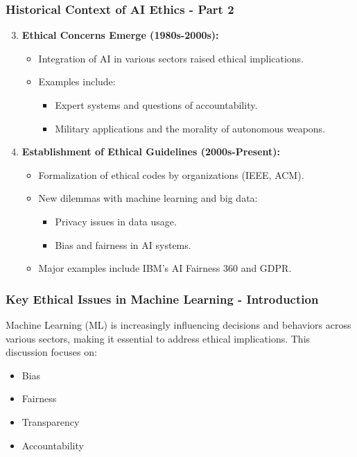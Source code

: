 \documentclass[aspectratio=169]{beamer}
\begin{document}
\begin{frame}[fragile]
    \frametitle{Historical Context of AI Ethics - Part 2}
    \begin{enumerate}
        \setcounter{enumi}{2}
        \item \textbf{Ethical Concerns Emerge (1980s-2000s):}
            \begin{itemize}
                \item Integration of AI in various sectors raised ethical implications.
                \item Examples include:
                    \begin{itemize}
                        \item Expert systems and questions of accountability.
                        \item Military applications and the morality of autonomous weapons.
                    \end{itemize}
            \end{itemize}
        \item \textbf{Establishment of Ethical Guidelines (2000s-Present):}
            \begin{itemize}
                \item Formalization of ethical codes by organizations (IEEE, ACM).
                \item New dilemmas with machine learning and big data:
                    \begin{itemize}
                        \item Privacy issues in data usage.
                        \item Bias and fairness in AI systems.
                    \end{itemize}
                \item Major examples include IBM's AI Fairness 360 and GDPR.
            \end{itemize}
    \end{enumerate}
\end{frame}

\begin{frame}[fragile]
  \frametitle{Key Ethical Issues in Machine Learning - Introduction}
  Machine Learning (ML) is increasingly influencing decisions and behaviors across various sectors, making it essential to address ethical implications. This discussion focuses on:
  \begin{itemize}
      \item Bias
      \item Fairness
      \item Transparency
      \item Accountability
  \end{itemize}
\end{frame}
\end{document}
